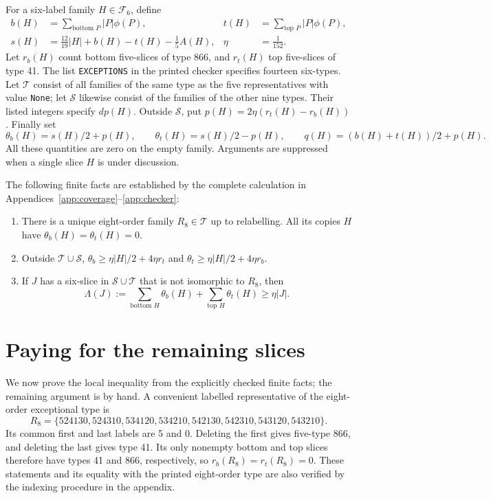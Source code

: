 \documentclass[11pt,letterpaper]{article}
\theoremstyle{definition}
\newcommand{\F}{\mathcal F}
\begin{document}
For a six-label family \(H\in\F_6\), define
\begin{align*}
 b(H)&=\sum_{\text{bottom }P}|P|\phi(P),&
 t(H)&=\sum_{\text{top }P}|P|\phi(P),\\
 s(H)&=\frac{12}{19}|H|+b(H)-t(H)-\frac15A(H),&
 \eta&=\frac1{152}.
\end{align*}
Let \(r_b(H)\) count bottom five-slices of type 866, and
\(r_t(H)\) top five-slices of type 41. The list
\texttt{EXCEPTIONS} in the printed checker specifies fourteen
six-types. Let \(\mathcal T\) consist of all families of the same type as
the five representatives with value \texttt{None}; let \(\mathcal S\)
likewise consist of the families of the other nine types. Their listed
integers specify \(dp(H)\). Outside \(\mathcal S\), put
\(p(H)=2\eta(r_t(H)-r_b(H))\). Finally set
\[
 \theta_b(H)=s(H)/2+p(H),\qquad\theta_t(H)=s(H)/2-p(H),
 \qquad q(H)=(b(H)+t(H))/2+p(H).
\]
All these quantities are zero on the empty family. Arguments are
suppressed when a single slice \(H\) is under discussion.

The following finite facts are established by the complete calculation
in Appendices~\ref{app:coverage}--\ref{app:checker}:
\begin{enumerate}[label=F\arabic*.]
\item There is a unique eight-order family \(R_8\in\mathcal T\)
      up to relabelling. All its copies \(H\) have
      \(\theta_b(H)=\theta_t(H)=0\).
\item Outside \(\mathcal T\cup\mathcal S\),
 \(\theta_b\geq\eta|H|/2+4\eta r_t\) and
 \(\theta_t\geq\eta|H|/2+4\eta r_b\).
\item If \(J\) has a six-slice in \(\mathcal S\cup\mathcal T\)
 that is not isomorphic to \(R_8\), then
\[
 \Lambda(J):=\sum_{\text{bottom }H}\theta_b(H)+
             \sum_{\text{top }H}\theta_t(H)\geq\eta|J|.
\]
\end{enumerate}

\clearpage
\section{Paying for the remaining slices}\label{sec:receiver}
We now prove the local inequality from the explicitly checked finite
facts; the remaining argument is by hand. A convenient labelled
representative of the eight-order exceptional type is
\[
 R_8=\{524130,524310,534120,534210,
       542130,542310,543120,543210\}.
\]
Its common first and last labels are 5 and 0. Deleting the first
gives five-type 866, and deleting the last gives type 41.
Its only nonempty bottom and top slices therefore have types 41 and
866, respectively, so \(r_b(R_8)=r_t(R_8)=0\).
These statements and its equality with the printed eight-order type
are also verified by the indexing procedure in the appendix.
\end{document}
